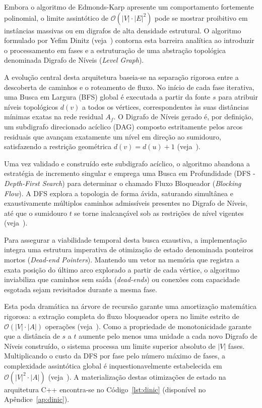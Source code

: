 \documentclass[12pt,a4paper]{article}
\begin{document}
Embora o algoritmo de Edmonds-Karp apresente um comportamento fortemente polinomial, o limite assintótico de $\mathcal{O}(|V| \cdot |E|^2)$ pode se mostrar proibitivo em instâncias massivas ou em digrafos de alta densidade estrutural. O algoritmo formulado por Yefim Dinitz (veja~\cite{dinic1970algorithm}) contorna esta barreira analítica ao introduzir o processamento em fases e a estruturação de uma abstração topológica denominada Digrafo de Níveis (\textit{Level Graph}).

A evolução central desta arquitetura baseia-se na separação rigorosa entre a descoberta de caminhos e o roteamento de fluxo. No início de cada fase iterativa, uma Busca em Largura (BFS) global é executada a partir da fonte $s$ para atribuir níveis topológicos $d(v)$ a todos os vértices, correspondentes às suas distâncias mínimas exatas na rede residual $A_f$. O Digrafo de Níveis gerado é, por definição, um subdigrafo direcionado acíclico (DAG) composto estritamente pelos arcos residuais que avançam exatamente um nível em direção ao sumidouro, satisfazendo a restrição geométrica $d(v) = d(u) + 1$ (veja~\cite{ahuja1993network}).

Uma vez validado e construído este subdigrafo acíclico, o algoritmo abandona a estratégia de incremento singular e emprega uma Busca em Profundidade (DFS - \textit{Depth-First Search}) para determinar o chamado Fluxo Bloqueador (\textit{Blocking Flow}). A DFS explora a topologia de forma ávida, saturando simultânea e exaustivamente múltiplos caminhos admissíveis presentes no Digrafo de Níveis, até que o sumidouro $t$ se torne inalcançável sob as restrições de nível vigentes (veja~\cite{cook1998combinatorial}).

Para assegurar a viabilidade temporal desta busca exaustiva, a implementação integra uma estrutura imperativa de otimização de estado denominada ponteiros mortos (\textit{Dead-end Pointers}). Mantendo um vetor na memória que registra a exata posição do último arco explorado a partir de cada vértice, o algoritmo inviabiliza que caminhos sem saída (\textit{dead-ends}) ou conexões com capacidade esgotada sejam revisitados durante a mesma fase.

Esta poda dramática na árvore de recursão garante uma amortização matemática rigorosa: a extração completa do fluxo bloqueador opera no limite estrito de $\mathcal{O}(|V| \cdot |A|)$ operações (veja~\cite{korte2018combinatorial}). Como a propriedade de monotonicidade garante que a distância de $s$ a $t$ aumente pelo menos uma unidade a cada novo Digrafo de Níveis construído, o sistema processa um limite superior absoluto de $|V|$ fases. Multiplicando o custo da DFS por fase pelo número máximo de fases, a complexidade assintótica global é inquestionavelmente estabelecida em $\mathcal{O}(|V|^2 \cdot |A|)$ (veja~\cite{dinic1970algorithm}). A materialização destas otimizações de estado na arquitetura C++ encontra-se no Código~\ref{lst:dinic} (disponível no Apêndice~\ref{ap:dinic}).
\end{document}
